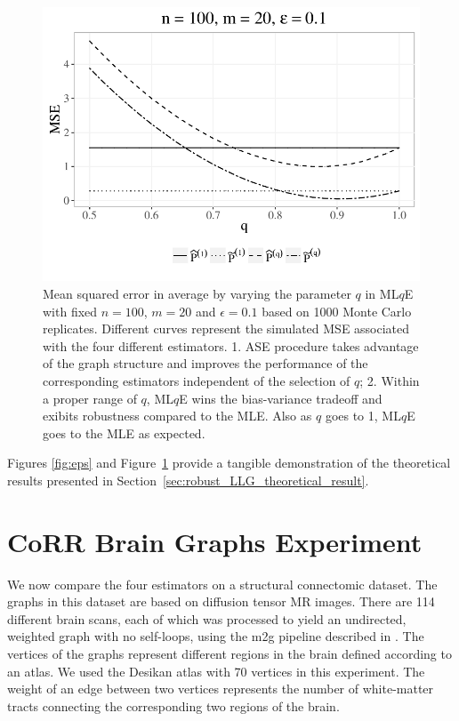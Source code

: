 \begin{figure}[!htb]
\centering
\includegraphics[width=1\textwidth]{./Figures/sim_q.pdf}
\caption{Mean squared error in average by varying the parameter $q$ in ML$q$E with fixed $n = 100$, $m = 20$ and $\epsilon = 0.1$ based on 1000 Monte Carlo replicates. Different curves represent the simulated MSE associated with the four different estimators.
1. ASE procedure takes advantage of the graph structure and improves the performance of the corresponding estimators independent of the selection of $q$;
2. Within a proper range of $q$, ML$q$E wins the bias-variance tradeoff and exibits robustness compared to the MLE. Also as $q$ goes to 1, ML$q$E goes to the MLE as expected.}
\label{fig:q}
\end{figure}


Figures \ref{fig:eps} and Figure~\ref{fig:q} provide a tangible demonstration of the theoretical results presented in Section~\ref{sec:robust_LLG_theoretical_result}.






\section{CoRR Brain Graphs Experiment}
\label{sec:robust_LLG_corr_data}

We now compare the four estimators on a structural connectomic dataset. The graphs in this dataset are based on diffusion tensor MR images. There are 114 different brain scans, each of which was processed to yield an undirected, weighted graph with no self-loops, using the m2g pipeline described in \citep{kiar2016ndmg}. The vertices of the graphs represent different regions in the brain defined according to an atlas. We used the Desikan atlas with 70 vertices in this experiment. The weight of an edge between two vertices represents the number of white-matter tracts connecting the corresponding two regions of the brain.

